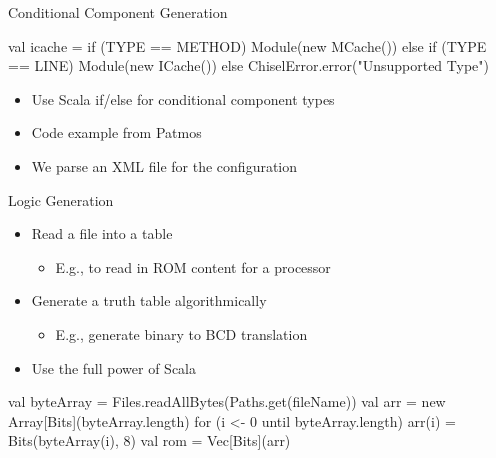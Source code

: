 \begin{frame}[fragile]{Conditional Component Generation}
\begin{chisel}
val icache =
  if (TYPE == METHOD)
    Module(new MCache())
  else if (TYPE == LINE)
    Module(new ICache())
  else
    ChiselError.error("Unsupported Type")
\end{chisel}
\begin{itemize}
\item Use Scala if/else for conditional component types
\item Code example from Patmos
\item We parse an XML file for the configuration
\end{itemize}
\end{frame}

\begin{frame}[fragile]{Logic Generation}
\begin{itemize}
\item Read a file into a table
\begin{itemize}
\item E.g., to read in ROM content for a processor
\end{itemize}
\item Generate a truth table algorithmically
\begin{itemize}
\item E.g., generate binary to BCD translation
\end{itemize}
\item Use the full power of Scala
\end{itemize}
\begin{chisel}
val byteArray = Files.readAllBytes(Paths.get(fileName))
val arr = new Array[Bits](byteArray.length)
for (i <- 0 until byteArray.length) {
  arr(i) = Bits(byteArray(i), 8)
}
val rom = Vec[Bits](arr)
\end{chisel}
\end{frame}
%


